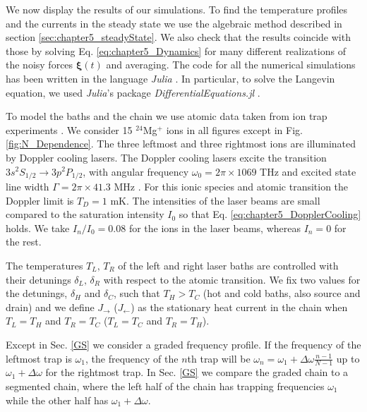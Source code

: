 We now display the results of our simulations. To find the temperature profiles and the currents in the steady state we use the algebraic method described in section \ref{sec:chapter5_steadyState}. We also check that the results coincide with those by solving Eq. \eqref{eq:chapter5_Dynamics} for many different realizations of the noisy forces $\bm\xi (t)$ and averaging. The code for all the numerical simulations has been written in the language \textit{Julia} \cite{Bezanson2012,Bezanson2017}. In particular, to solve the Langevin equation, we used \textit{Julia}'s package \textit{DifferentialEquations.jl} \cite{Rackauckas2017}.

To model the baths and the chain we use atomic data taken from ion trap experiments \cite{Leupold2015,Lo2015}. We consider 15 $^{24}$Mg$^+$ ions in all figures except in Fig. \ref{fig:N_Dependence}. The three leftmost and three rightmost ions are illuminated by Doppler cooling lasers. The Doppler cooling lasers excite the transition $3s^2S_{1/2}\rightarrow 3p^2P_{1/2}$, with angular frequency $\omega_0 = 2 \pi \times 1069$ THz and excited state line width $\Gamma = 2\pi \times 41.3$ MHz \cite{Ruiz2014}. For this ionic species and atomic transition the Doppler limit is $T_D = 1$ mK.
The intensities of the laser beams are small compared to the saturation intensity $I_0$ so that Eq. \eqref{eq:chapter5_DopplerCooling} holds. We take $I_n/I_0 = 0.08$ for the ions  in the laser beams, whereas  $I_n=0$ for the rest.

The temperatures $T_L,\,T_R$ of the left and right laser baths are controlled with their detunings $\delta_L,\,\delta_R$ with respect to the atomic transition. We fix two values for the detunings, $\delta_H$ and $\delta_C$, such that $T_H>T_C$ (hot and cold baths, also source and drain) and we define $J_\rightarrow$ ($J_\leftarrow$) as the stationary heat current in the chain when $T_L = T_H$ and $T_R = T_C$ ($T_L = T_C$ and $T_R = T_H$).

Except in Sec. \ref{GS} we consider a graded frequency profile.
If the frequency of the leftmost trap is $\omega_1$, the frequency of the $n$th trap will be $\omega_n = \omega_1 +\Delta\omega\frac{n-1}{N-1}$ up to $\omega_1 +\Delta\omega$ for the rightmost trap. In
Sec. \ref{GS} we compare the graded chain to a segmented chain, where the left half of the chain has trapping frequencies $\omega_1$ while the other half has $\omega_1 +\Delta\omega$.


